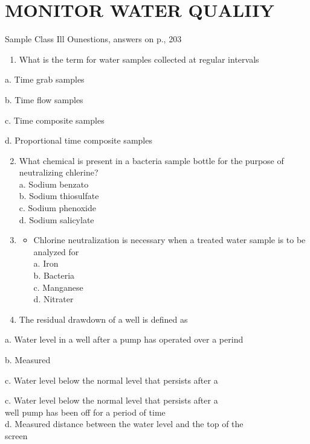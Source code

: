 \documentclass[10pt]{article}
\begin{document}
\section{MONITOR WATER QUALIIY}
Sample Class Ill Ounestions, answers on p., 203

\begin{enumerate}
  \item What is the term for water samples collected at regular intervals
\end{enumerate}

a. Time grab samples

b. Time flow samples

c. Time composite samples

d. Proportional time composite samples

\begin{enumerate}
  \setcounter{enumi}{1}
  \item What chemical is present in a bacteria sample bottle for the purpose of neutralizing chlerine?\\
a. Sodium benzato\\
b. Sodium thiosulfate\\
c. Sodium phenoxide\\
d. Sodium salicylate

  \item 
  \begin{itemize}
    \item Chlorine neutralization is necessary when a treated water sample is to be analyzed for\\
a. Iron\\
b. Bacteria\\
c. Manganese\\
d. Nitrater
  \end{itemize}
  \item The residual drawdown of a well is defined as

\end{enumerate}

a. Water level in a well after a pump has operated over a perind

b. Measured

c. Water level below the normal level that persists after a

c. Water level below the normal level that persists after a\\
well pump has been off for a period of time\\
d. Measured distance between the water level and the top of the\\
screen
\end{document}
